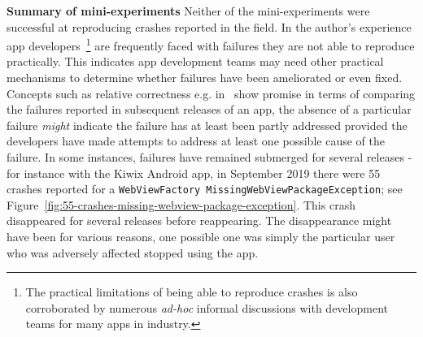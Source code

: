 \textbf{Summary of mini-experiments}
Neither of the mini-experiments were successful at reproducing crashes reported in the field. In the author's experience app developers~\footnote{The practical limitations of being able to reproduce crashes is also corroborated by numerous \textit{ad-hoc} informal discussions with development teams for many apps in industry.} are frequently faced with failures they are not able to reproduce practically. This indicates app development teams may need other practical mechanisms to determine whether failures have been ameliorated or even fixed. Concepts such as relative correctness e.g. in~\citep{ghardallou2016debugging_without_testing} show promise in terms of comparing the failures reported in subsequent releases of an app, the absence of a particular failure \textit{might} indicate the failure has at least been partly addressed provided the developers have made attempts to address at least one possible cause of the failure. In some instances, failures have remained submerged for several releases - for instance with the Kiwix Android app, in September 2019 there were 55 crashes reported for a \texttt{WebViewFactory MissingWebViewPackageException}; see Figure~\ref{fig:55-crashes-missing-webview-package-exception}. This crash disappeared for several releases before reappearing. The disappearance might have been for various reasons, one possible one was simply the particular user who was adversely affected stopped using the app. 

